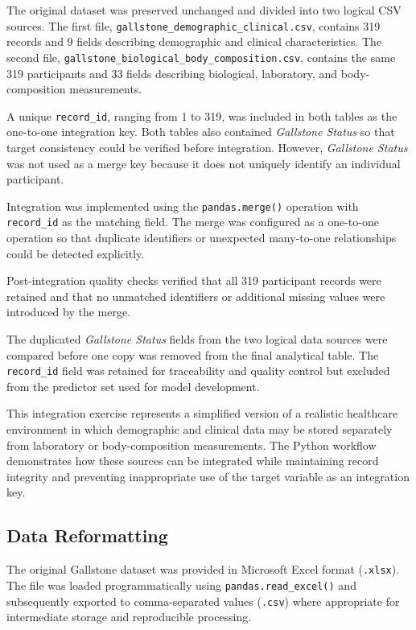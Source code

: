The original dataset was preserved unchanged and divided into two logical CSV
sources. The first file,
\texttt{gallstone\_demographic\_clinical.csv}, contains 319 records and
9 fields describing demographic and clinical characteristics. The second file,
\texttt{gallstone\_biological\_body\_composition.csv}, contains the same
319 participants and 33 fields describing biological, laboratory, and
body-composition measurements.

A unique \texttt{record\_id}, ranging from 1 to 319, was included in both
tables as the one-to-one integration key. Both tables also contained
\textit{Gallstone Status} so that target consistency could be verified before
integration. However, \textit{Gallstone Status} was not used as a merge key
because it does not uniquely identify an individual participant.

Integration was implemented using the \texttt{pandas.merge()} operation with
\texttt{record\_id} as the matching field. The merge was configured as a
one-to-one operation so that duplicate identifiers or unexpected many-to-one
relationships could be detected explicitly.

Post-integration quality checks verified that all 319 participant records were
retained and that no unmatched identifiers or additional missing values were
introduced by the merge.

The duplicated \textit{Gallstone Status} fields from the two logical data
sources were compared before one copy was removed from the final analytical
table. The \texttt{record\_id} field was retained for traceability and quality
control but excluded from the predictor set used for model development.

This integration exercise represents a simplified version of a realistic
healthcare environment in which demographic and clinical data may be stored
separately from laboratory or body-composition measurements. The Python
workflow demonstrates how these sources can be integrated while maintaining
record integrity and preventing inappropriate use of the target variable as an
integration key.


\subsection{Data Reformatting}
\label{subsec:data-reformatting}

The original Gallstone dataset was provided in Microsoft Excel format
(\texttt{.xlsx}). The file was loaded programmatically using
\texttt{pandas.read\_excel()} and subsequently exported to comma-separated
values (\texttt{.csv}) where appropriate for intermediate storage and
reproducible processing.

